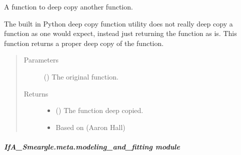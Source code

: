 \documentclass[letterpaper,10pt,english]{sphinxmanual}
\begin{document}

\begin{fulllineitems}
\label{\detokenize{python_docstrings/IfA_Smeargle.meta.meta_programming:IfA_Smeargle.meta.meta_programming.smeargle_deepcopy_function}}
A function to deep copy another function.

The built in Python deep copy function utility does not really deep copy
a function as one would expect, instead just returning the function as is.
This function returns a proper deep copy of the function.
\begin{quote}\begin{description}
\item[{Parameters}] \leavevmode
{} () \textendash{} The original function.

\item[{Returns}] \leavevmode
\begin{itemize}
\item {} 
 () \textendash{} The function deep copied.

\item {} 
 \textendash{} Based on  (Aaron Hall)

\end{itemize}


\end{description}\end{quote}

\end{fulllineitems}



\subparagraph{IfA\_Smeargle.meta.modeling\_and\_fitting module}
\label{\detokenize{python_docstrings/IfA_Smeargle.meta.modeling_and_fitting:module-IfA_Smeargle.meta.modeling_and_fitting}}\label{\detokenize{python_docstrings/IfA_Smeargle.meta.modeling_and_fitting:ifa-smeargle-meta-modeling-and-fitting-module}}\label{\detokenize{python_docstrings/IfA_Smeargle.meta.modeling_and_fitting::doc}}
\end{document}
